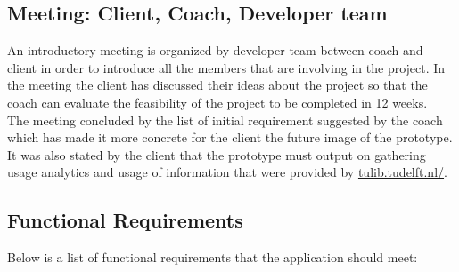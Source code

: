 \subsection{Meeting: Client, Coach, Developer team } %
\label{sub:meeting_client_coach_developer_team_meeting_}

An introductory meeting is organized by developer team between coach and client in order to introduce all the members that are involving in the project. In the meeting the client has discussed their ideas about the project so that the coach can evaluate the feasibility of the project to be completed in 12 weeks.\\
The meeting concluded by the list of initial requirement suggested by the coach which has made it more concrete for the client the future image of the prototype. It was also stated by the client that the prototype must output on gathering usage analytics and usage of information that were provided by \url{tulib.tudelft.nl/}.\\ 



\subsection{Functional Requirements} %
\label{sub:functional_requirement}

Below is a list of functional requirements that the application should meet:

